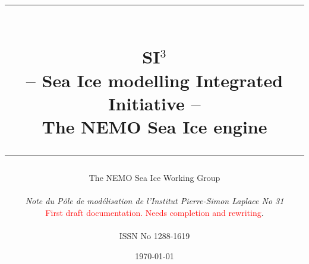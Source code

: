 \documentclass[a4paper, 11pt]{book}
\begin{document}


\title{
\vspace{1.5cm}
\rule{400pt}{1.5pt} \\
\vspace{0.45cm}
 {\Huge SI$^3$ \\}
 {\Large -- Sea Ice modelling Integrated Initiative --}\\
 {\Large The NEMO Sea Ice engine}\\ 
\date{\today}
\author{The NEMO Sea Ice Working Group \\
\\
\small \textit{Note du P\^ole de mod\'elisation de l'Institut Pierre-Simon Laplace No 31} \\
\small \textcolor{red}{First draft documentation. Needs completion and rewriting}. \\
\\
ISSN No 1288-1619\\
}
\rule{400pt}{1.5pt}
}

\maketitle						%

\frontmatter


\dominitoc
\tableofcontents



\mainmatter















%

%

%

%

%

%

%

%

%

\end{document}
